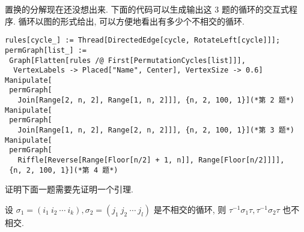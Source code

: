 \documentclass[color=black,device=normal,lang=cn,mode=geye]{elegantnote}
\begin{document}
\begin{solution}
    置换的分解现在还没想出来. 下面的代码可以生成输出这 3 题的循环的交互式程序. 循环以图的形式给出, 可以方便地看出有多少个不相交的循环.
\begin{verbatim}
rules[cycle_] := Thread[DirectedEdge[cycle, RotateLeft[cycle]]];
permGraph[list_] := 
 Graph[Flatten[rules /@ First[PermutationCycles[list]]], 
  VertexLabels -> Placed["Name", Center], VertexSize -> 0.6]
Manipulate[
 permGraph[
   Join[Range[2, n, 2], Range[1, n, 2]]], {n, 2, 100, 1}](*第 2 题*)
Manipulate[
 permGraph[
   Join[Range[1, n, 2], Range[2, n, 2]]], {n, 2, 100, 1}](*第 3 题*)
Manipulate[
 permGraph[
   Riffle[Reverse[Range[Floor[n/2] + 1, n]], Range[Floor[n/2]]]],
 {n, 2, 100, 1}](*第 4 题*)
\end{verbatim}
\end{solution}

证明下面一题需要先证明一个引理.
\begin{lemma}\label{l2.1}
    设 $\sigma_1=(i_1\ i_2\ \cdots\ i_k),\sigma_2=(j_1\ j_2\ \cdots\ j_l)$ 是不相交的循环, 则 $\tau^{-1}\sigma_1\tau,\tau^{-1}\sigma_2\tau$ 也不相交.
\end{lemma}
\end{document}
